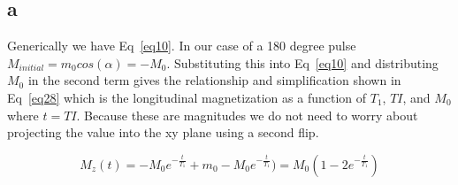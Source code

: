 \documentclass[12pt]{article}
\begin{document}
\subsection{a}
Generically we have Eq~\ref{eq10}. In our case of a 180 degree pulse $M_{initial} = m_0cos(\alpha) = -M_0$. Substituting this into Eq~\ref{eq10} and distributing $M_0$ in the second term gives the relationship and simplification shown in Eq~\ref{eq28} which is the longitudinal magnetization as a function of $T_1$, $TI$, and $M_0$ where $t = TI$. Because these are magnitudes we do not need to worry about projecting the value into the xy plane using a second flip. 

\begin{equation}
M_z(t) = -M_0  e^{-\frac{t}{T_1}} + m_0-M_0e^{-\frac{t}{T_1}}) = M_0(1-2e^{-\frac{t}{T_1}})
\label{eq28}
\end{equation}
\end{document}
